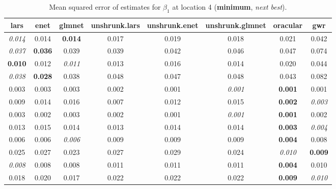 \documentclass[authoryear, review, 11pt]{elsarticle}
\begin{document}
		\begin{table}[ht]
		\begin{center}
		\begin{tabular}{cccccccc}
		 lars & enet & glmnet & unshrunk.lars & unshrunk.enet & unshrunk.glmnet & oracular & gwr \\ 
		  \hline
		\emph{0.014} & 0.014 & \textbf{0.014} & 0.017 & 0.019 & 0.018 & 0.021 & 0.042 \\ 
		  \emph{0.037} & \textbf{0.036} & 0.039 & 0.039 & 0.042 & 0.046 & 0.047 & 0.074 \\ 
		  \textbf{0.010} & 0.012 & \emph{0.011} & 0.013 & 0.016 & 0.014 & 0.020 & 0.044 \\ 
		  \emph{0.038} & \textbf{0.028} & 0.038 & 0.048 & 0.047 & 0.048 & 0.043 & 0.082 \\ 
		  0.003 & 0.003 & 0.003 & 0.002 & 0.001 & \emph{0.001} & \textbf{0.001} & 0.001 \\ 
		  0.009 & 0.014 & 0.016 & 0.007 & 0.012 & 0.015 & \textbf{0.002} & \emph{0.003} \\ 
		  0.003 & 0.002 & 0.003 & 0.002 & 0.001 & \emph{0.001} & \textbf{0.001} & 0.002 \\ 
		  0.013 & 0.015 & 0.014 & 0.013 & 0.014 & 0.014 & \textbf{0.003} & \emph{0.004} \\ 
		  0.006 & 0.006 & \emph{0.006} & 0.009 & 0.009 & 0.009 & \textbf{0.004} & 0.008 \\ 
		  0.025 & 0.027 & 0.023 & 0.027 & 0.029 & 0.024 & \emph{0.010} & \textbf{0.009} \\ 
		  \emph{0.008} & 0.008 & 0.008 & 0.011 & 0.011 & 0.011 & \textbf{0.004} & 0.010 \\ 
		  0.018 & 0.020 & 0.017 & 0.022 & 0.022 & 0.022 & \textbf{0.009} & \emph{0.010} \\ 
		  \end{tabular}
		\caption{Mean squared error of estimates for $\beta_1$ at location 4 (\textbf{minimum}, \emph{next best}).\label{loc4-X1-MSEX}}
		\end{center}
		\end{table}
		
\end{document}
